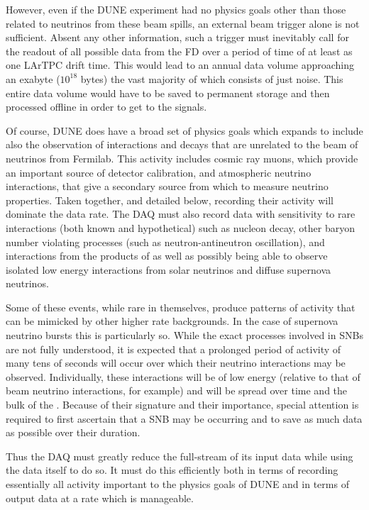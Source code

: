 However, even if the DUNE experiment had no physics goals other than
those related to neutrinos from these beam spills, an external beam
trigger alone is not sufficient. 
Absent any other information, such a trigger must inevitably call for
the readout of all possible data from the FD over a period of time of
at least as one LArTPC drift time. 
This would lead to an annual data volume approaching an exabyte
($10^{18}$ bytes) the vast majority of which consists of just noise. 
This entire data volume would have to be saved to permanent storage
and then processed offline in order to get to the signals.

Of course, DUNE does have a broad set of physics goals which expands
to include also the observation of interactions and decays that are
unrelated to the beam of neutrinos from Fermilab. 
This activity includes cosmic ray muons, which provide an important
source of detector calibration, and atmospheric neutrino interactions,
that give a secondary source from which to measure neutrino
properties. 
Taken together, and detailed below, recording their activity will
dominate the data rate.
The DAQ must also record data with sensitivity to rare interactions
(both known and hypothetical) such as nucleon decay, other baryon
number violating processes (such as neutron-antineutron oscillation),
and interactions from the products of  as well as possibly
being able to observe isolated low energy interactions from solar
neutrinos and diffuse supernova neutrinos. 

Some of these events, while rare in themselves, produce patterns of
activity that can be mimicked by other higher rate backgrounds.
In the case of supernova neutrino bursts this is particularly so. 
While the exact processes involved in SNBs are not fully understood,
it is expected that a prolonged period of activity of many tens of
seconds will occur over which their neutrino interactions may be
observed. 
Individually, these interactions will be of low energy (relative to
that of beam neutrino interactions, for example) and will be spread
over time and the bulk of the . 
Because of their signature and their importance, special attention is
required to first ascertain that a SNB may be occurring and to save as
much data as possible over their duration.

Thus the DAQ must greatly reduce the full-stream of its input data
while using the data itself to do so. 
It must do this efficiently both in terms of recording essentially all
activity important to the physics goals of DUNE and in terms of
output data at a rate which is manageable.  


